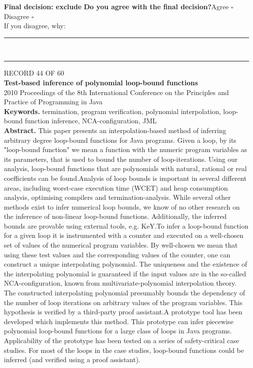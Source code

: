 \documentclass[11pt,a4paper]{article}
\begin{document}
{\small\textbf{Final decision: exclude}}
\vspace{2mm}
{\small\textbf{Do you agree with the final decision?}\quad{}Agree $\square$\qquad{}Disagree $\square$}\\[1mm]
{\footnotesize\color{soft}If you disagree, why:}\\[1mm]
\color{rule}\rule{\linewidth}{0.3pt}\\[3mm]\rule{\linewidth}{0.3pt}\color{black}
\clearpage
{\color{soft}\footnotesize RECORD 44 OF 60}\\[1mm]
{\large\bfseries Test-based inference of polynomial loop-bound functions}\\[1.5mm]
{\color{soft}\small 2010 \textperiodcentered{} Proceedings of the 8th International Conference on the Principles and Practice of Programming in Java}\\[2mm]
{\small\textbf{Keywords.} termination, program verification, polynomial interpolation, loop-bound function inference, NCA-configuration, JML}\\[2mm]
{\small\textbf{Abstract.} This paper presents an interpolation-based method of inferring arbitrary degree loop-bound functions for Java programs. Given a loop, by its "loop-bound function" we mean a function with the numeric program variables as its parameters, that is used to bound the number of loop-iterations. Using our analysis, loop-bound functions that are polynomials with natural, rational or real coefficients can be found.Analysis of loop bounds is important in several different areas, including worst-case execution time (WCET) and heap consumption analysis, optimising compilers and termination-analysis. While several other methods exist to infer numerical loop bounds, we know of no other research on the inference of non-linear loop-bound functions. Additionally, the inferred bounds are provable using external tools, e.g. KeY.To infer a loop-bound function for a given loop it is instrumented with a counter and executed on a well-chosen set of values of the numerical program variables. By well-chosen we mean that using these test values and the corresponding values of the counter, one can construct a unique interpolating polynomial. The uniqueness and the existence of the interpolating polynomial is guaranteed if the input values are in the so-called NCA-configuration, known from multivariate-polynomial interpolation theory. The constructed interpolating polynomial presumably bounds the dependency of the number of loop iterations on arbitrary values of the program variables. This hypothesis is verified by a third-party proof assistant.A prototype tool has been developed which implements this method. This prototype can infer piecewise polynomial loop-bound functions for a large class of loops in Java programs. Applicability of the prototype has been tested on a series of safety-critical case studies. For most of the loops in the case studies, loop-bound functions could be inferred (and verified using a proof assistant).}
\end{document}
